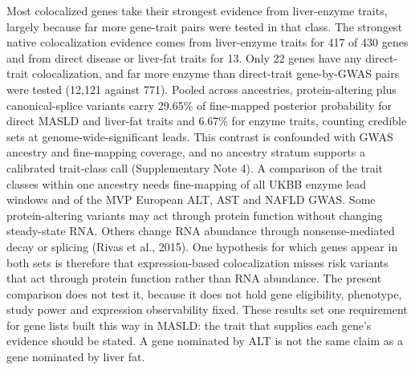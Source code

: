 Most colocalized genes take their strongest evidence from liver-enzyme traits,
largely because far more gene-trait pairs were tested in that class. The
strongest native colocalization evidence comes from liver-enzyme traits for 417
of 430 genes and from direct disease or liver-fat traits for 13. Only 22 genes
have any direct-trait colocalization, and far more enzyme than direct-trait
gene-by-GWAS pairs were tested (12,121 against 771). Pooled across ancestries,
protein-altering plus canonical-splice variants carry 29.65\% of fine-mapped
posterior probability for direct MASLD and liver-fat traits and 6.67\% for enzyme
traits, counting credible sets at genome-wide-significant leads. This contrast is confounded with GWAS ancestry and fine-mapping
coverage, and no ancestry stratum supports a calibrated trait-class call
(Supplementary Note 4). A comparison of the trait classes within one ancestry
needs fine-mapping of all UKBB enzyme lead windows and of the MVP European ALT,
AST and NAFLD GWAS. Some protein-altering variants may act through protein
function without changing steady-state RNA. Others change RNA abundance through
nonsense-mediated decay or splicing (Rivas et al., 2015). One hypothesis for
which genes appear in both sets is therefore that expression-based
colocalization misses risk variants that act through protein function rather
than RNA abundance. The present comparison does not test it, because it does not
hold gene eligibility, phenotype, study power and expression observability
fixed. These results set one requirement for gene lists built this way in MASLD:
the trait that supplies each gene's evidence should be stated. A gene nominated
by ALT is not the same claim as a gene nominated by liver fat.

